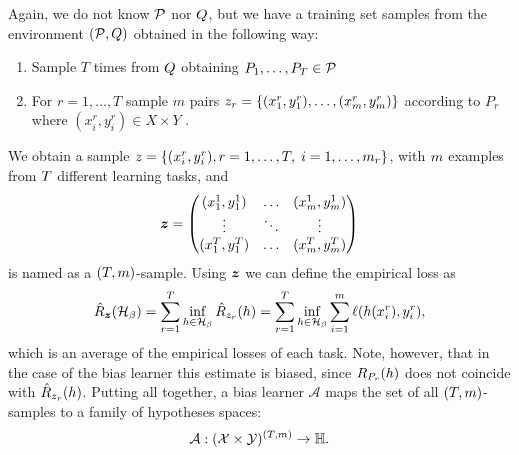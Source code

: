 Again, we do not know $\mathcal{P}$ nor $Q$, but we have a training set samples from the environment $(\mathcal{P}, Q)$ obtained in the following way:
\begin{enumerate}
    \item Sample $T$ times from $Q$ obtaining $P_1, \ldots, P_T \in \mathcal{P}$
    \item For $r=1, \ldots, T$ sample $m$ pairs $z_r = \{(x_1^r, y_1^r), \ldots, (x_m^r, y_m^r)\}$ according to $P_r$ where $(x_i^r, y_i^r) \in X \times Y$ .
\end{enumerate}
We obtain a sample $z=\{(x_i^r, y_i^r), r=1, \ldots, T, \; i=1, \ldots, m_r \}$, with $m$ examples from $T$ different learning tasks, and
\begin{equation}
    \nonumber
    \bm{z} = 
    \begin{pmatrix}
        (x_1^1, y_1^1) & \ldots & (x_m^1, y_m^1) \\
        \vdots & \ddots & \vdots \\
        (x_1^T, y_1^T) & \ldots & (x_m^T, y_m^T) \\
    \end{pmatrix}
\end{equation}
is named as a $(T, m)$-sample.
Using $\bm{z}$ we can define the empirical loss as
\begin{equation}\label{eq:biaslearn_emprisk}
    \bemprisk(\hypspace_\fparam) = \sum_{r=1}^\ntasks \inf_{\hypf \in \hypspace_\fparam} \hat{\risk}_{\sample_r}(\hypf) = \sum_{r=1}^\ntasks \inf_{\hypf \in \hypspace_\fparam} \sum_{i=1}^m \lossf(\hypf(x_i^r), y_i^r),
\end{equation}
which is an average of the empirical losses of each task. 
Note, however, that in the case of the bias learner this estimate is biased, since $R_{P_r}(h)$ does not coincide with $\hat{R}_{z_r}(h)$. 
Putting all together, a bias learner $\mathcal{A}$ maps the set of all $(T, m)$-samples to a family of hypotheses spaces:
\begin{equation}
    \nonumber
    \mathcal{A} : {(\mathcal{X} \times \mathcal{Y})^{(T, m)}} \to \mathbb{H}.
\end{equation}
%

